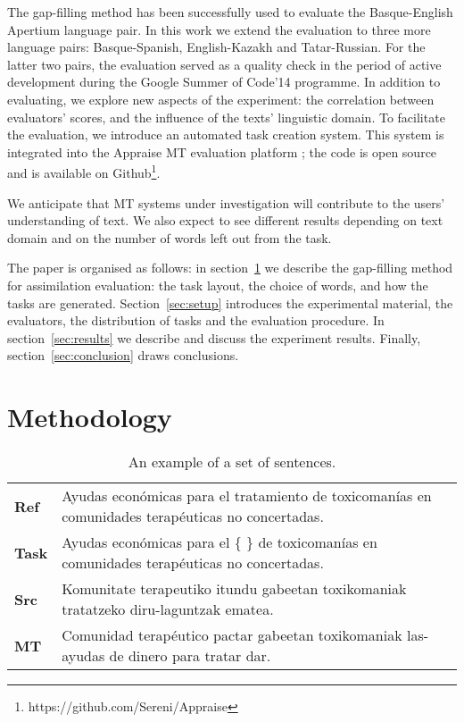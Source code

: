 \documentclass[11pt]{article}
\newcommand{\comment}[1]{\marginpar{\scriptsize\sf \textcolor{blue}{#1}}}
\begin{document}
The gap-filling method has been successfully used to evaluate the Basque-English Apertium language pair. In this work we extend the evaluation to three more language pairs: Basque-Spanish, English-Kazakh and Tatar-Russian. For the latter two pairs, the evaluation served as a quality check in the period of active development during the Google Summer of Code'14 programme. In addition to evaluating, we explore new aspects of the experiment: the correlation between evaluators' scores, and the influence of the texts' linguistic domain. To facilitate the evaluation, we introduce an automated task creation system. This system is integrated into the Appraise MT evaluation platform \citep{federmann12}; the code is open source and is available on Github\footnote{https://github.com/Sereni/Appraise}.

We anticipate that MT systems under investigation will contribute to the users' understanding of text. We also expect to see different results depending on text domain and on the number of words left out from the task.

The paper is organised as follows: in section~\ref{sec:methodology} we describe the gap-filling method for assimilation evaluation: the task layout, the choice of words, and how the tasks are generated. Section~\ref{sec:setup} introduces the experimental material, the evaluators, the distribution of tasks and the evaluation procedure. In section~\ref{sec:results} we describe and discuss the experiment results. Finally, section~\ref{sec:conclusion} draws conclusions.


\section{Methodology}
\label{sec:methodology}
\comment{FMT: This could benefit from an example i think, something like table1? }

\begin{table*}
  \begin{tabular}{|l|l|}
     \hline
     \textbf{Ref}   & Ayudas económicas para el tratamiento de toxicomanías en comunidades terapéuticas no concertadas. \\
     \textbf{Task}   & Ayudas económicas para el \{ \} de toxicomanías en comunidades terapéuticas no concertadas. \\
     \textbf{Src} & Komunitate terapeutiko itundu gabeetan toxikomaniak tratatzeko diru-laguntzak ematea. \\
     \textbf{MT}     & Comunidad terapéutico pactar gabeetan toxikomaniak las-ayudas de dinero para tratar dar. \\
     \hline
  \end{tabular}
  \caption{An example of a set of sentences.} 
  \label{table:example}
\end{table*}
\end{document}

